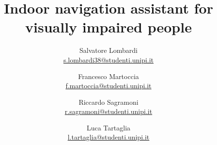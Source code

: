 \documentclass[a4paper, 11pt]{article} %
\title{\textbf{Indoor navigation assistant for visually impaired people}}
\author{Salvatore Lombardi \\ \href{mailto:s.lombardi38@studenti.unipi.it}{s.lombardi38@studenti.unipi.it} \and Francesco Martoccia \\ \href{mailto:s.lombardi38@studenti.unipi.it}{f.martoccia@studenti.unipi.it} \and Riccardo Sagramoni \\ \href{mailto:s.lombardi38@studenti.unipi.it}{r.sagramoni@studenti.unipi.it} \and Luca Tartaglia \\ \href{mailto:s.lombardi38@studenti.unipi.it}{l.tartaglia@studenti.unipi.it}}
\date{}
\begin{document}
\maketitle

\begin{multicols*}{2}







\hypersetup{
    urlcolor=black
}
\nocite{*}
\printbibliography


\end{multicols*}
\end{document}
